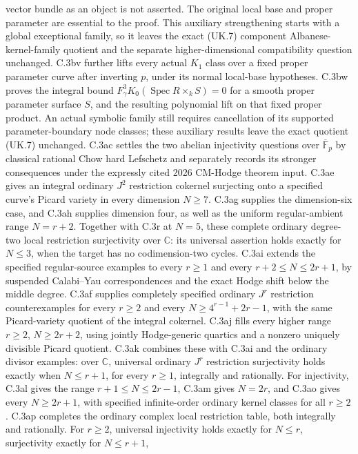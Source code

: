 vector bundle as an object is not asserted. The original local base and
proper parameter are essential to the proof. This auxiliary strengthening
starts with a global exceptional family, so it leaves the exact (UK.7)
component Albanese-kernel-family quotient and the separate higher-dimensional
compatibility question unchanged.
C.3bv further lifts every actual $K_1$ class over a fixed proper
parameter curve after inverting $p$, under its normal local-base
hypotheses. C.3bw proves the integral bound
$F_\gamma^3K_0(\operatorname{Spec}R\times_k S)=0$ for a smooth proper
parameter surface $S$, and the resulting polynomial lift on that fixed
proper product. An actual symbolic family still requires cancellation
of its supported parameter-boundary node classes; these auxiliary
results leave the exact quotient (UK.7) unchanged.
C.3ac settles the two abelian
injectivity questions over $\overline{\mathbb F}_p$ by
classical rational Chow hard Lefschetz and separately
records its stronger consequences under the expressly
cited 2026 CM-Hodge theorem input.
C.3ae gives an integral ordinary $J^2$ restriction cokernel
surjecting onto a specified curve's Picard variety in every
dimension $N\ge7$. C.3ag supplies the dimension-six case,
and C.3ah supplies dimension four, as well as the uniform
regular-ambient range $N=r+2$. Together with C.3r at $N=5$,
these complete ordinary degree-two local restriction
surjectivity over $\mathbb C$: its universal assertion
holds exactly for $N\le3$, when the target has no
codimension-two cycles.
C.3ai extends the specified regular-source examples to every
$r\ge1$ and every $r+2\le N\le2r+1$, by suspended
Calabi--Yau correspondences and the exact Hodge shift below
the middle degree.
C.3af supplies completely specified ordinary $J^r$
restriction counterexamples for every $r\ge2$ and every
$N\ge4^{r-1}+2r-1$, with the same Picard-variety quotient
of the integral cokernel. C.3aj fills every higher range
$r\ge2$, $N\ge2r+2$, using jointly Hodge-generic quartics
and a nonzero uniquely divisible Picard quotient.
C.3ak combines these with C.3ai and the ordinary divisor
examples: over $\mathbb C$, universal ordinary $J^r$
restriction surjectivity holds exactly when $N\le r+1$,
for every $r\ge1$, integrally and rationally.
For injectivity, C.3al gives the range
$r+1\le N\le2r-1$, C.3am gives $N=2r$, and C.3ao gives
every $N\ge2r+1$, with specified infinite-order ordinary
kernel classes for all $r\ge2$. C.3ap completes the
ordinary complex local restriction table, both integrally
and rationally. For $r\ge2$, universal injectivity holds
exactly for $N\le r$, surjectivity exactly for $N\le r+1$,
